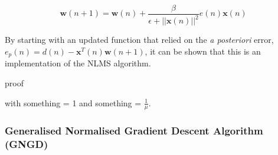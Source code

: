 \documentclass[main.tex]{subfiles}
\begin{document}
\begin{equation*}
\textbf{w}(n+1) = \textbf{w}(n) + \frac{\beta}{\epsilon + ||\textbf{x}(n)||^2}e(n)\textbf{x}(n)
\end{equation*}

By starting with an updated function that relied on the \textit{a posteriori} error, $e_p(n) = d(n) - \textbf{x}^T(n)\textbf{w}(n+1)$, it can be shown that this is an implementation of the NLMS algorithm.

proof

with something = 1 and something = $\frac{1}{\mu}$.



\subsubsection{Generalised Normalised Gradient Descent Algorithm (GNGD)}
\end{document}
